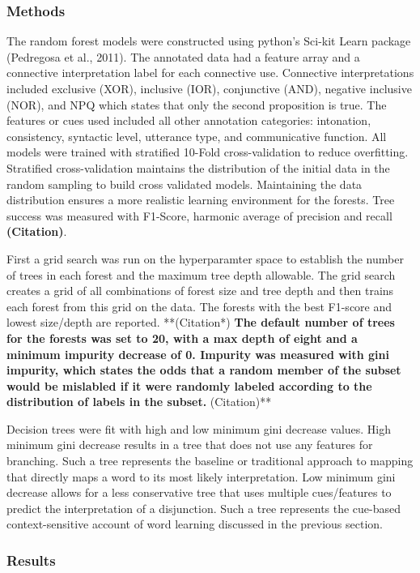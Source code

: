 \documentclass[floatsintext,man]{apa6}
\theoremstyle{definition}
\theoremstyle{definition}
\theoremstyle{definition}
\theoremstyle{remark}
\begin{document}
\subsubsection{Methods}\label{methods-2}

The random forest models were constructed using python's Sci-kit Learn
package (Pedregosa et al., 2011). The annotated data had a feature array
and a connective interpretation label for each connective use.
Connective interpretations included exclusive (XOR), inclusive (IOR),
conjunctive (AND), negative inclusive (NOR), and NPQ which states that
only the second proposition is true. The features or cues used included
all other annotation categories: intonation, consistency, syntactic
level, utterance type, and communicative function. All models were
trained with stratified 10-Fold cross-validation to reduce overfitting.
Stratified cross-validation maintains the distribution of the initial
data in the random sampling to build cross validated models. Maintaining
the data distribution ensures a more realistic learning environment for
the forests. Tree success was measured with F1-Score, harmonic average
of precision and recall \textbf{(Citation)}.

First a grid search was run on the hyperparamter space to establish the
number of trees in each forest and the maximum tree depth allowable. The
grid search creates a grid of all combinations of forest size and tree
depth and then trains each forest from this grid on the data. The
forests with the best F1-score and lowest size/depth are reported.
**(Citation*)\textbf{ The default number of trees for the forests was
set to 20, with a max depth of eight and a minimum impurity decrease of
0. Impurity was measured with gini impurity, which states the odds that
a random member of the subset would be mislabled if it were randomly
labeled according to the distribution of labels in the subset.
}(Citation)**

Decision trees were fit with high and low minimum gini decrease values.
High minimum gini decrease results in a tree that does not use any
features for branching. Such a tree represents the baseline or
traditional approach to mapping that directly maps a word to its most
likely interpretation. Low minimum gini decrease allows for a less
conservative tree that uses multiple cues/features to predict the
interpretation of a disjunction. Such a tree represents the cue-based
context-sensitive account of word learning discussed in the previous
section.

\subsubsection{Results}\label{results-1}
\end{document}
